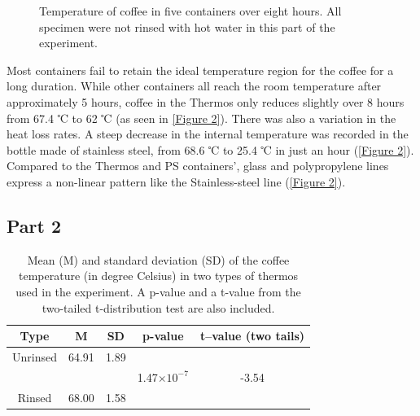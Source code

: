 \documentclass[11pt]{article}
\begin{document}
\begin{figure}[h!]
\centering
\resizebox{0.9\textwidth}{0.5\textheight}
{
}
	\caption{Temperature of coffee in five containers over eight hours. All specimen were not rinsed with hot water in this part of the experiment.}
	\label{Figure 4}
\end{figure}


Most containers fail to retain the ideal temperature region for the coffee for a long duration. While other containers all reach the room temperature after approximately 5 hours, coffee in the Thermos only reduces slightly over 8 hours from 67.4 ℃ to 62  ℃ (as seen in \autoref{Figure 2}). There was also a variation in the heat loss rates. A steep decrease in the internal temperature was recorded in the bottle made of stainless steel, from 68.6 ℃ to 25.4  ℃ in just an hour (\autoref{Figure 2}). Compared to the Thermos and PS containers’, glass and polypropylene lines express a non-linear pattern like the Stainless-steel line (\autoref{Figure 2}). 

\subsection*{Part 2}

\begin{table}[h!]
	\centering
	\begin{threeparttable}
		\caption{Mean (M) and standard deviation (SD) of the coffee temperature (in degree Celsius) in two types of thermos used in the experiment. A p-value and a t-value from the two-tailed t-distribution test are also included.}
		\label{Table 2}
		\begin{tabular*}{\textwidth}{ @{\extracolsep{\fill}} ccccc}
			\toprule
			Type & M & SD & p-value & t–value (two tails)\\
			\midrule 
			Unrinsed 		& 64.91   &1.89		&						&		 \\
						&		  &		    &1.47$\times10^{-7}$ 	&-3.54	 \\			
			Rinsed  	& 68.00   &1.58	&							&	 	 \\
			\bottomrule
		\end{tabular*}
	\end{threeparttable}
\end{table}
\end{document}
